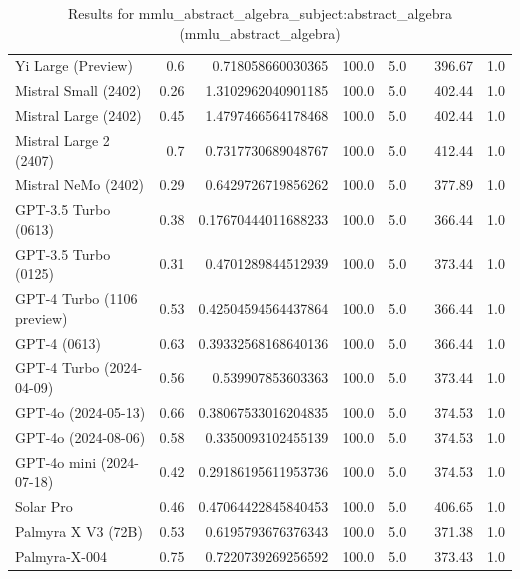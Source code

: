 \begin{table}[htp]
{\begin{tabular}{lrrrrrrr}
Yi Large (Preview) & 0.6 & 0.718058660030365 & 100.0 & 5.0 &  & 396.67 & 1.0 \\
Mistral Small (2402) & 0.26 & 1.3102962040901185 & 100.0 & 5.0 &  & 402.44 & 1.0 \\
Mistral Large (2402) & 0.45 & 1.4797466564178468 & 100.0 & 5.0 &  & 402.44 & 1.0 \\
Mistral Large 2 (2407) & 0.7 & 0.7317730689048767 & 100.0 & 5.0 &  & 412.44 & 1.0 \\
Mistral NeMo (2402) & 0.29 & 0.6429726719856262 & 100.0 & 5.0 &  & 377.89 & 1.0 \\
GPT-3.5 Turbo (0613) & 0.38 & 0.17670444011688233 & 100.0 & 5.0 &  & 366.44 & 1.0 \\
GPT-3.5 Turbo (0125) & 0.31 & 0.4701289844512939 & 100.0 & 5.0 &  & 373.44 & 1.0 \\
GPT-4 Turbo (1106 preview) & 0.53 & 0.42504594564437864 & 100.0 & 5.0 &  & 366.44 & 1.0 \\
GPT-4 (0613) & 0.63 & 0.39332568168640136 & 100.0 & 5.0 &  & 366.44 & 1.0 \\
GPT-4 Turbo (2024-04-09) & 0.56 & 0.539907853603363 & 100.0 & 5.0 &  & 373.44 & 1.0 \\
GPT-4o (2024-05-13) & 0.66 & 0.38067533016204835 & 100.0 & 5.0 &  & 374.53 & 1.0 \\
GPT-4o (2024-08-06) & 0.58 & 0.3350093102455139 & 100.0 & 5.0 &  & 374.53 & 1.0 \\
GPT-4o mini (2024-07-18) & 0.42 & 0.29186195611953736 & 100.0 & 5.0 &  & 374.53 & 1.0 \\
Solar Pro & 0.46 & 0.47064422845840453 & 100.0 & 5.0 &  & 406.65 & 1.0 \\
Palmyra X V3 (72B) & 0.53 & 0.6195793676376343 & 100.0 & 5.0 &  & 371.38 & 1.0 \\
Palmyra-X-004 & 0.75 & 0.7220739269256592 & 100.0 & 5.0 &  & 373.43 & 1.0 \\
\bottomrule
\end{tabular}}
\caption{Results for mmlu_abstract_algebra_subject:abstract_algebra (mmlu_abstract_algebra)}
\label{fig:mmlu_abstract_algebra_subject:abstract_algebra (mmlu_abstract_algebra)}
\end{table}